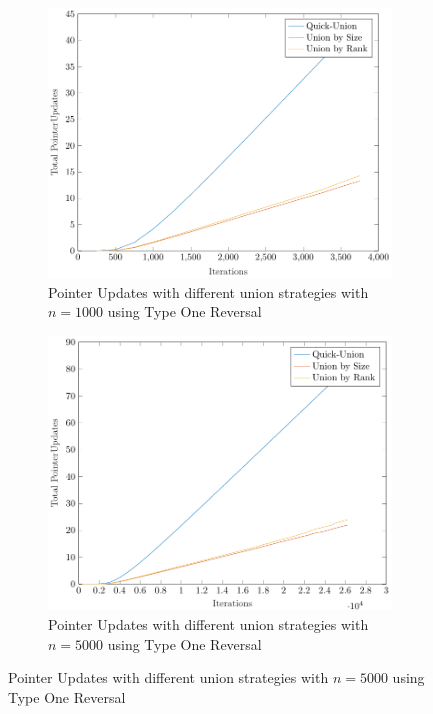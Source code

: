 \begin{figure}[ht]
    \begin{subfigure}{0.32\textwidth}
        \centering
        \includegraphics[width=\textwidth]{../images/plotTORFull1000_PointerUpdates.pdf}
        \caption{Pointer Updates with different union strategies with $n = 1000$ using Type One Reversal}
    \end{subfigure}%
    \hfill
    \begin{subfigure}{0.32\textwidth}
        \centering
        \includegraphics[width=\textwidth]{../images/plotTORFull5000_PointerUpdates.pdf}
        \caption{Pointer Updates with different union strategies with $n = 5000$ using Type One Reversal}

\end{subfigure}
\end{figure}
